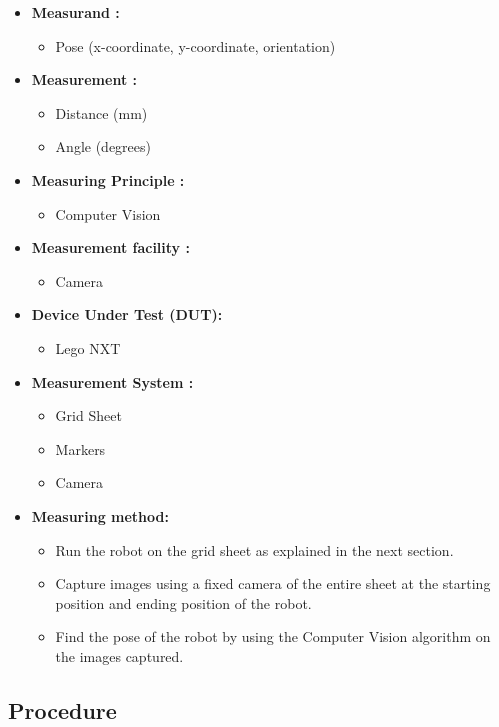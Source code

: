 	\begin{itemize}
		\item	
		\textbf{Measurand :}
		\begin{itemize}
			\item
			Pose (x-coordinate, y-coordinate, orientation)
		\end{itemize}
		
		\item
		\textbf{Measurement :}
		\begin{itemize}
			\item
			Distance (mm)
			\item
			Angle (degrees)
		\end{itemize}
		\item
		\textbf{Measuring Principle :}
		\begin{itemize}
			\item
			Computer Vision
		\end{itemize} 
		\item
		\textbf{Measurement facility :}
		\begin{itemize}
			\item
			Camera
		\end{itemize} 
		\item
		\textbf{Device Under Test (DUT):}
		\begin{itemize}
			\item
			Lego NXT
		\end{itemize} 
		\item
		\textbf{Measurement System :}
		\begin{itemize}
			\item
			Grid Sheet
			\item
			Markers
			\item
			Camera
		\end{itemize}
		\item
		\textbf{Measuring method: }
		\begin{itemize}
			\item
			Run the robot on the grid sheet as explained in the next section.
			\item
			Capture images using a fixed camera of the entire sheet at the starting position and ending position of the robot.
			\item
			Find the pose of the robot by using the Computer Vision algorithm on the images captured.
		\end{itemize}
\end{itemize}

\subsection{Procedure}
